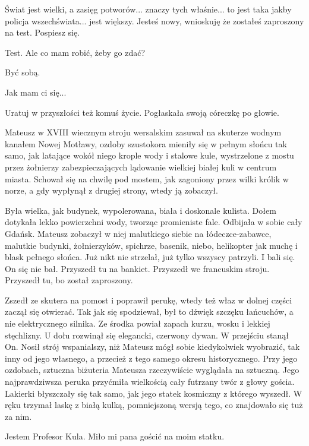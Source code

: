\ds{} Świat jest wielki, a zasięg potworów... znaczy tych właśnie... to jest taka jakby policja wszechświata... jest większy.
Jesteś nowy, wnioskuję że zostałeś zaproszony na test. Pospiesz się.\de{}

\ds{} Test. Ale co mam robić, żeby go zdać? \de{}

\ds{} Być sobą. \de{}

\ds{} Jak mam ci się... \de{}

\ds{} Uratuj w przyszłości też komuś życie. \dm{} Pogłaskała swoją córeczkę po głowie. \de{}

Mateusz w XVIII wiecznym stroju wersalskim zasuwał na skuterze wodnym kanałem Nowej Motławy, ozdoby szustokora mieniły się w pełnym słońcu tak samo, jak latające wokół niego
krople wody i stalowe kule, wystrzelone z mostu przez żołnierzy zabezpieczających
lądowanie wielkiej białej kuli w centrum miasta.
Schował się na chwilę pod mostem, jak zagoniony przez wilki królik w norze, a gdy wypłynął z drugiej strony, wtedy ją zobaczył.

Była wielka, jak budynek, wypolerowana, biała i doskonale kulista.
Dołem dotykała lekko powierzchni wody, tworząc promieniste fale.
Odbijała w sobie cały Gdańsk.
Mateusz zobaczył w niej malutkiego siebie na łódeczce-zabawce, malutkie budynki, żołnierzyków, spichrze, basenik, niebo, helikopter jak muchę i blask pełnego słońca.
Już nikt nie strzelał, już tylko wszyscy patrzyli. I bali się.
On się nie bał. Przyszedł tu na bankiet.
Przyszedł we francuskim stroju.
Przyszedł tu, bo został zaproszony.

Zszedł ze skutera na pomost i poprawił perukę, wtedy też właz w dolnej części zaczął się otwierać.
Tak jak się spodziewał, był to dźwięk szczęku łańcuchów, a nie elektrycznego silnika.
Ze środka powiał zapach kurzu, wosku i lekkiej stęchlizny.
U dołu rozwinął się elegancki, czerwony dywan.
W przejściu stanął On.
Nosił strój wspanialszy, niż Mateusz mógł sobie kiedykolwiek wyobrazić, tak inny od jego własnego, a przecież z tego samego okresu historycznego.
Przy jego ozdobach, sztuczna biżuteria Mateusza rzeczywiście wyglądała na sztuczną.
Jego najprawdziwsza peruka przyćmiła wielkością cały futrzany twór z głowy gościa.
Lakierki błyszczały się tak samo, jak jego statek kosmiczny z którego wyszedł.
W ręku trzymał laskę z białą kulką, pomniejszoną wersją tego, co znajdowało się tuż za nim.

\ds{} Jestem Profesor Kula. Miło mi pana gościć na moim statku. \de{}

\divider{}

